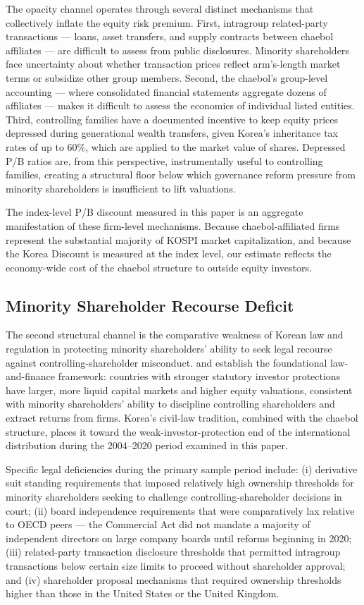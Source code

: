 \documentclass[12pt]{article}
\begin{document}
The opacity channel operates through several distinct mechanisms that collectively inflate the
equity risk premium. First, intragroup related-party transactions --- loans, asset transfers,
and supply contracts between chaebol affiliates --- are difficult to assess from public
disclosures. Minority shareholders face uncertainty about whether transaction prices reflect
arm's-length market terms or subsidize other group members. Second, the chaebol's group-level
accounting --- where consolidated financial statements aggregate dozens of affiliates --- makes
it difficult to assess the economics of individual listed entities. Third, controlling families
have a documented incentive to keep equity prices depressed during generational wealth
transfers, given Korea's inheritance tax rates of up to 60\%, which are applied to the
market value of shares. Depressed P/B ratios are, from this perspective, instrumentally
useful to controlling families, creating a structural floor below which governance reform
pressure from minority shareholders is insufficient to lift valuations.

The index-level P/B discount measured in this paper is an aggregate manifestation of these
firm-level mechanisms. Because chaebol-affiliated firms represent the substantial majority of
KOSPI market capitalization, and because the Korea Discount is measured at the index level,
our estimate reflects the economy-wide cost of the chaebol structure to outside equity investors.

\subsection{Minority Shareholder Recourse Deficit}

The second structural channel is the comparative weakness of Korean law and regulation in
protecting minority shareholders' ability to seek legal recourse against controlling-shareholder
misconduct. \citet{porta1998} and \citet{porta2002} establish the foundational law-and-finance
framework: countries with stronger statutory investor protections have larger, more liquid
capital markets and higher equity valuations, consistent with minority shareholders' ability
to discipline controlling shareholders and extract returns from firms. Korea's civil-law
tradition, combined with the chaebol structure, places it toward the weak-investor-protection
end of the international distribution during the 2004--2020 period examined in this paper.

Specific legal deficiencies during the primary sample period include: (i) derivative suit
standing requirements that imposed relatively high ownership thresholds for minority
shareholders seeking to challenge controlling-shareholder decisions in court; (ii) board
independence requirements that were comparatively lax relative to OECD peers --- the
Commercial Act did not mandate a majority of independent directors on large company boards
until reforms beginning in 2020; (iii) related-party transaction disclosure thresholds that
permitted intragroup transactions below certain size limits to proceed without shareholder
approval; and (iv) shareholder proposal mechanisms that required ownership thresholds higher
than those in the United States or the United Kingdom.
\end{document}
